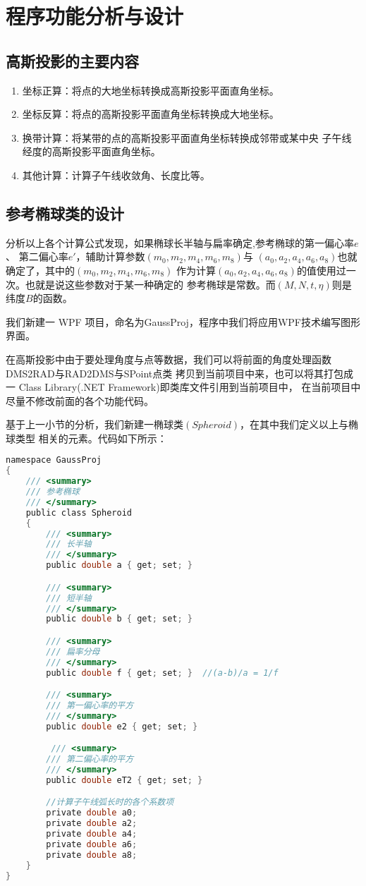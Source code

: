 \section{程序功能分析与设计}

\subsection{高斯投影的主要内容}
\begin{enumerate}
    \item 坐标正算：将点的大地坐标转换成高斯投影平面直角坐标。
    \item 坐标反算：将点的高斯投影平面直角坐标转换成大地坐标。
    \item 换带计算：将某带的点的高斯投影平面直角坐标转换成邻带或某中央
    子午线经度的高斯投影平面直角坐标。
    \item 其他计算：计算子午线收敛角、长度比等。
\end{enumerate}

\subsection{参考椭球类的设计}

分析以上各个计算公式发现，如果椭球长半轴与扁率确定,参考椭球的第一偏心率$e$、
第二偏心率$e'$，辅助计算参数$(m_0, m_2, m_4, m_6, m_8)$与
$(a_0, a_2, a_4, a_6, a_8)$也就确定了，其中的$(m_0, m_2, m_4, m_6, m_8)$
作为计算$(a_0, a_2, a_4, a_6, a_8)$的值使用过一次。也就是说这些参数对于某一种确定的
参考椭球是常数。而$(M,N,t,\eta)$则是纬度$B$的函数。

我们新建一 WPF 项目，命名为GaussProj，程序中我们将应用WPF技术编写图形界面。

在高斯投影中由于要处理角度与点等数据，我们可以将前面的角度处理函数DMS2RAD与RAD2DMS与SPoint点类
拷贝到当前项目中来，也可以将其打包成一 Class Library(.NET Framework)即类库文件引用到当前项目中，
在当前项目中尽量不修改前面的各个功能代码。

基于上一小节的分析，我们新建一椭球类$(Spheroid)$，在其中我们定义以上与椭球类型
相关的元素。代码如下所示：
 \begin{lstlisting}[language=C]
namespace GaussProj
{
    /// <summary>
    /// 参考椭球
    /// </summary>
    public class Spheroid
    {
        /// <summary>
        /// 长半轴
        /// </summary>
        public double a { get; set; }

        /// <summary>
        /// 短半轴
        /// </summary>
        public double b { get; set; }

        /// <summary>
        /// 扁率分母
        /// </summary>
        public double f { get; set; }  //(a-b)/a = 1/f

        /// <summary>
        /// 第一偏心率的平方
        /// </summary>
        public double e2 { get; set; }

         /// <summary>
        /// 第二偏心率的平方
        /// </summary>
        public double eT2 { get; set; }

        //计算子午线弧长时的各个系数项
        private double a0;
        private double a2;
        private double a4;
        private double a6;
        private double a8;
    }
}
\end{lstlisting}

